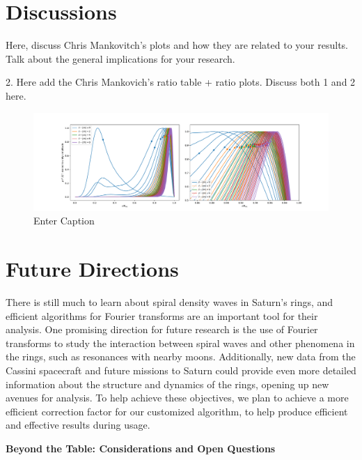\documentclass{article}
\begin{document}
\section{Discussions}
Here, discuss Chris Mankovitch's plots and how they are related to your results. Talk about the general implications for your research.

2. Here add the Chris Mankovich's ratio table + ratio plots. Discuss both 1 and 2 here.


\begin{figure}
    \centering
    \includegraphics[width=1.1\linewidth]{mode_energy_integrands (2).pdf}
    \caption{Enter Caption}
    \label{fig:enter-label}
\end{figure}





\section{Future Directions}
There is still much to learn about spiral density waves in Saturn's rings, and efficient algorithms for Fourier transforms are an important tool for their analysis. One promising direction for future research is the use of Fourier transforms to study the interaction between spiral waves and other phenomena in the rings, such as resonances with nearby moons. Additionally, new data from the Cassini spacecraft and future missions to Saturn could provide even more detailed information about the structure and dynamics of the rings, opening up new avenues for analysis. To help achieve these objectives, we plan to achieve a more efficient correction factor for our customized algorithm, to help produce efficient and effective results during usage. 




\textbf{Beyond the Table: Considerations and Open Questions}
\end{document}
